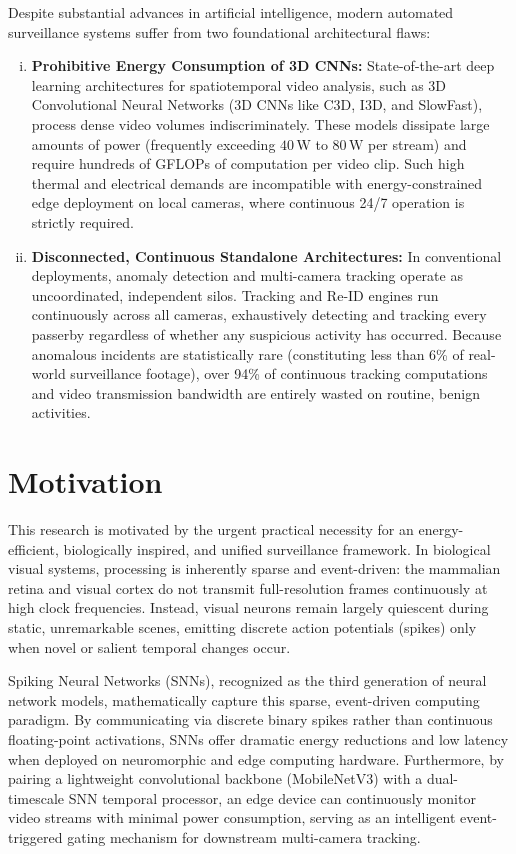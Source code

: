 \documentclass[12pt,a4paper]{report}
\begin{document}
Despite substantial advances in artificial intelligence, modern automated surveillance systems suffer from two foundational architectural flaws:
\begin{enumerate}[(i)]
    \item \textbf{Prohibitive Energy Consumption of 3D CNNs:} State-of-the-art deep learning architectures for spatiotemporal video analysis, such as 3D Convolutional Neural Networks (3D CNNs like C3D, I3D, and SlowFast), process dense video volumes indiscriminately. These models dissipate large amounts of power (frequently exceeding $40\,\text{W}$ to $80\,\text{W}$ per stream) and require hundreds of GFLOPs of computation per video clip. Such high thermal and electrical demands are incompatible with energy-constrained edge deployment on local cameras, where continuous 24/7 operation is strictly required.
    \item \textbf{Disconnected, Continuous Standalone Architectures:} In conventional deployments, anomaly detection and multi-camera tracking operate as uncoordinated, independent silos. Tracking and Re-ID engines run continuously across all cameras, exhaustively detecting and tracking every passerby regardless of whether any suspicious activity has occurred. Because anomalous incidents are statistically rare (constituting less than 6\% of real-world surveillance footage), over 94\% of continuous tracking computations and video transmission bandwidth are entirely wasted on routine, benign activities.
\end{enumerate}

\section{Motivation}
This research is motivated by the urgent practical necessity for an energy-efficient, biologically inspired, and unified surveillance framework. In biological visual systems, processing is inherently sparse and event-driven: the mammalian retina and visual cortex do not transmit full-resolution frames continuously at high clock frequencies. Instead, visual neurons remain largely quiescent during static, unremarkable scenes, emitting discrete action potentials (spikes) only when novel or salient temporal changes occur.

Spiking Neural Networks (SNNs), recognized as the third generation of neural network models, mathematically capture this sparse, event-driven computing paradigm. By communicating via discrete binary spikes rather than continuous floating-point activations, SNNs offer dramatic energy reductions and low latency when deployed on neuromorphic and edge computing hardware. Furthermore, by pairing a lightweight convolutional backbone (MobileNetV3) with a dual-timescale SNN temporal processor, an edge device can continuously monitor video streams with minimal power consumption, serving as an intelligent event-triggered gating mechanism for downstream multi-camera tracking.
\end{document}

